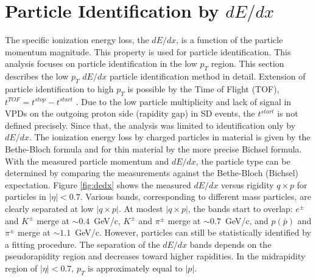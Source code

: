 \section{Particle Identification by $dE/dx$}\label{sec:pid}
The specific ionization energy loss, the $dE/dx$, is a function of the
particle momentum magnitude. This property is used
for particle identification. This analysis focuses on particle
identification in the low $p_T$ region. This section describes
the low $p_T$ $dE/dx$ particle identification method in detail.
Extension of particle identification to high $p_T$ is possible
by the Time of Flight (TOF), $t^{TOF}=t^{stop}-t^{start}$ . Due to the low particle multiplicity and lack of signal in VPDs on the outgoing proton side (rapidity gap) in SD events, the $t^{start}$ is not defined precisely. Since that, the analysis was limited to identification only by $dE/dx$. \newline
The ionization energy loss by charged particles in material
is given by the Bethe-Bloch formula and for
thin material by the more precise Bichsel formula\cite{Bichsel:2006cs}.
With the measured particle momentum and $dE/dx$,
the particle type can be determined by comparing the
measurements against the Bethe-Bloch (Bichsel) expectation. Figure \ref{fig:dedx} shows the measured $dE/dx$ versus rigidity $q\times p$ for particles in $|\eta| < 0.7$. Various bands, corresponding
to different mass particles, are clearly separated
at low $|q\times p|$. At modest $|q\times p|$, the bands start to
overlap: $e^\pm$ and $K^\pm$ merge at $\sim0.4$~GeV/c, $K^\pm$ and
$\pi^\pm$ merge at $\sim0.7$~GeV/c, and $p(\bar{p})$ and $\pi^\pm$ merge
at $\sim1.1$~GeV/c. However, particles can still be statistically
identified by a fitting procedure. The
separation of the $dE/dx$ bands depends on the pseudorapidity
region and decreases toward higher rapidities.
In the midrapidity region of $|\eta| < 0.7$, $p_T$ is approximately equal to $|p|$.


